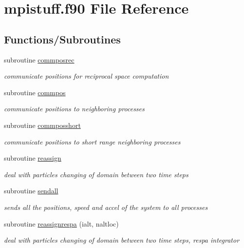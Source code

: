 \hypertarget{mpistuff_8f90}{\section{mpistuff.\-f90 File Reference}
\label{mpistuff_8f90}
}
\subsection*{Functions/\-Subroutines}
\begin{DoxyCompactItemize}
\item 
subroutine \hyperlink{mpistuff_8f90_a42f224f96229ba3fd381eaad0cb34aab}{commposrec}
\begin{DoxyCompactList}\small\item\em communicate positions for reciprocal space computation \end{DoxyCompactList}\item 
subroutine \hyperlink{mpistuff_8f90_ac39921abd416740a5df1fc61a4812225}{commpos}
\begin{DoxyCompactList}\small\item\em communicate positions to neighboring processes \end{DoxyCompactList}\item 
subroutine \hyperlink{mpistuff_8f90_ace4e2ff17d7280286a327d17668b3503}{commposshort}
\begin{DoxyCompactList}\small\item\em communicate positions to short range neighboring processes \end{DoxyCompactList}\item 
subroutine \hyperlink{mpistuff_8f90_ad588a0b841f6206b8cc5b13da18adaef}{reassign}
\begin{DoxyCompactList}\small\item\em deal with particles changing of domain between two time steps \end{DoxyCompactList}\item 
subroutine \hyperlink{mpistuff_8f90_a6ed1b35d7433270bdc77772828f1d1bf}{sendall}
\begin{DoxyCompactList}\small\item\em sends all the positions, speed and accel of the system to all processes \end{DoxyCompactList}\item 
subroutine \hyperlink{mpistuff_8f90_ae42481d71653637f187f91bdb09468d7}{reassignrespa} (ialt, naltloc)
\begin{DoxyCompactList}\small\item\em deal with particles changing of domain between two time steps, respa integrator \end{DoxyCompactList}\item 

\end{DoxyCompactItemize}
